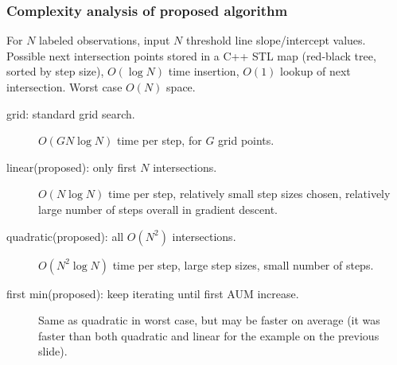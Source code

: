\documentclass[t]{beamer}
\begin{document}
\begin{frame}
  \frametitle{Complexity analysis of proposed algorithm}

  For $N$ labeled observations, input $N$ threshold line
  slope/intercept values. Possible next intersection points stored in
  a C++ STL map (red-black tree, sorted by step size), $O(\log N)$
  time insertion, $O(1)$ lookup of next intersection. Worst case $O(N)$
  space.
  \begin{description}
  \item[grid: standard grid search.] $O(G N\log N)$ time per step, 
    for $G$ grid points.
  \item[linear(proposed): only first $N$ intersections.]
    $O(N\log N)$ time per step, relatively small step sizes chosen,
    relatively large number of steps overall in gradient descent.
  \item[quadratic(proposed): all $O(N^2)$ intersections.]
    $O(N^2\log N)$ time per step, large step sizes, small number of
    steps.
  \item[first min(proposed): keep iterating until first AUM increase.]
    Same as quadratic in worst case, but may be faster on average (it
    was faster than both quadratic and linear for the example on the
    previous slide).
  \end{description}
\end{frame}

\end{document}
